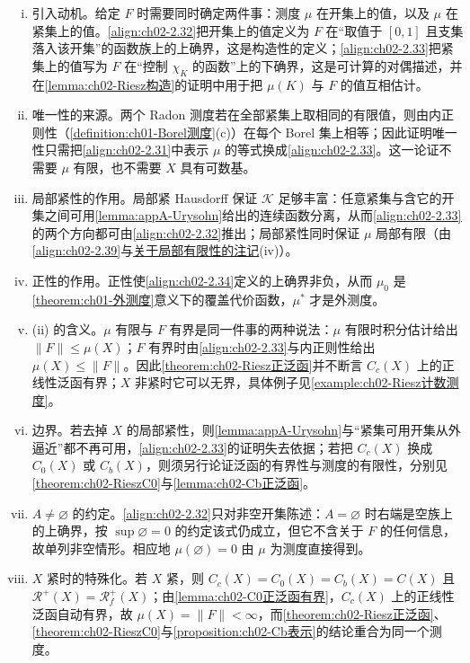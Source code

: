 \documentclass[../../main.tex]{subfiles}%
\begin{document}
\begin{remark}\label{remark:ch02-Riesz表示动机}
\begin{enumerate}[(i)]
\item 引入动机。给定 $F$ 时需要同时确定两件事：测度 $\mu$ 在开集上的值，以及 $\mu$ 在紧集上的值。\eqref{align:ch02-2.32}把开集上的值定义为 $F$ 在“取值于 $[0,1]$ 且支集落入该开集”的函数族上的上确界，这是构造性的定义；\eqref{align:ch02-2.33}把紧集上的值写为 $F$ 在“控制 $\chi_K$ 的函数”上的下确界，这是可计算的对偶描述，并在\cref{lemma:ch02-Riesz构造}的证明中用于把 $\mu(K)$ 与 $F$ 的值互相估计。
\item 唯一性的来源。两个 Radon 测度若在全部紧集上取相同的有限值，则由内正则性（\cref{definition:ch01-Borel测度}(c)）在每个 Borel 集上相等；因此证明唯一性只需把\eqref{align:ch02-2.31}中表示 $\mu$ 的等式换成\eqref{align:ch02-2.33}。这一论证不需要 $\mu$ 有限，也不需要 $X$ 具有可数基。
\item 局部紧性的作用。局部紧 Hausdorff 保证 $\mathscr K$ 足够丰富：任意紧集与含它的开集之间可用\cref{lemma:appA-Urysohn}给出的连续函数分离，从而\eqref{align:ch02-2.33}的两个方向都可由\eqref{align:ch02-2.32}推出；局部紧性同时保证 $\mu$ 局部有限（由\eqref{align:ch02-2.39}与\hyperref[remark:ch01-局部有限]{关于局部有限性的注记}(iv)）。
\item 正性的作用。正性使\eqref{align:ch02-2.34}定义的上确界非负，从而 $\mu_0$ 是\cref{theorem:ch01-外测度}意义下的覆盖代价函数，$\mu^*$ 才是外测度。
\item (ii) 的含义。$\mu$ 有限与 $F$ 有界是同一件事的两种说法：$\mu$ 有限时积分估计给出 $\|F\|\leqslant\mu(X)$；$F$ 有界时由\eqref{align:ch02-2.33}与内正则性给出 $\mu(X)\leqslant\|F\|$。因此\cref{theorem:ch02-Riesz正泛函}并不断言 $C_c(X)$ 上的正线性泛函有界；$X$ 非紧时它可以无界，具体例子见\cref{example:ch02-Riesz计数测度}。
\item 边界。若去掉 $X$ 的局部紧性，则\cref{lemma:appA-Urysohn}与“紧集可用开集从外逼近”都不再可用，\eqref{align:ch02-2.33}的证明失去依据；若把 $C_c(X)$ 换成 $C_0(X)$ 或 $C_b(X)$，则须另行论证泛函的有界性与测度的有限性，分别见\cref{theorem:ch02-RieszC0}与\cref{lemma:ch02-Cb正泛函}。
\item $A\neq\varnothing$ 的约定。\eqref{align:ch02-2.32}只对非空开集陈述：$A=\varnothing$ 时右端是空族上的上确界，按 $\sup\varnothing=0$ 的约定该式仍成立，但它不含关于 $F$ 的任何信息，故单列非空情形。相应地 $\mu(\varnothing)=0$ 由 $\mu$ 为测度直接得到。
\item $X$ 紧时的特殊化。若 $X$ 紧，则 $C_c(X)=C_0(X)=C_b(X)=C(X)$ 且 $\mathscr R^+(X)=\mathscr R^+_f(X)$；由\cref{lemma:ch02-C0正泛函有界}，$C_c(X)$ 上的正线性泛函自动有界，故 $\mu(X)=\|F\|<\infty$，而\cref{theorem:ch02-Riesz正泛函}、\cref{theorem:ch02-RieszC0}与\cref{proposition:ch02-Cb表示}的结论重合为同一个测度。
\end{enumerate}
\end{remark}
\end{document}
